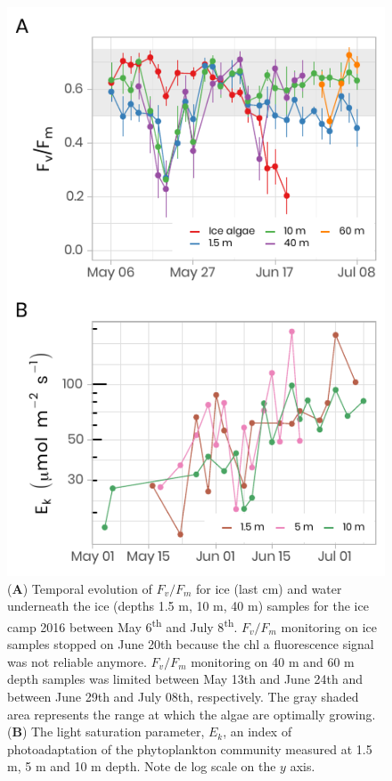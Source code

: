 \documentclass[essd, manuscript]{copernicus}
\begin{document}
\begin{figure}[H]
	\centering
	\includegraphics[scale = 1]{../../../graphs/fig13.pdf}
	\caption{(\textbf{A}) Temporal evolution of $F_v/F_m$ for ice (last cm) and water underneath the ice (depths 1.5 m, 10 m, 40 m) samples for the ice camp 2016 between May 6\textsuperscript{th} and July 8\textsuperscript{th}. $F_v/F_m$ monitoring on ice samples stopped on June 20th because the chl a fluorescence signal was not reliable anymore. $F_v/F_m$ monitoring on 40 m and 60 m depth samples was limited between May 13th and June 24th and between June 29th and July 08th, respectively. The gray shaded area represents the range at which the algae are optimally growing. (\textbf{B}) The light saturation parameter, $E_k$, an index of photoadaptation of the phytoplankton community measured at 1.5 m, 5 m and 10 m depth. Note de log scale on the $y$ axis.}
\end{figure}
\end{document}
